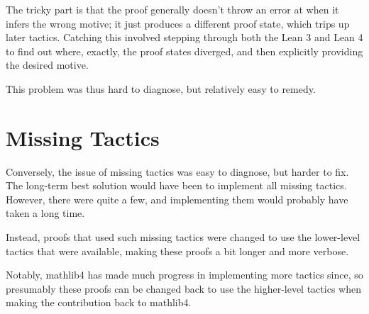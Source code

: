 The tricky part is that the proof generally doesn't throw an error at  when it
infers the wrong motive; it just produces a different proof state, which trips up later tactics.
Catching this involved stepping through both the Lean 3 and Lean 4 to find out where, exactly, the proof states
diverged, and then explicitly providing the desired motive.

This problem was thus hard to diagnose, but relatively easy to remedy.


\section{Missing Tactics} 
Conversely, the issue of missing tactics was easy to diagnose, but harder to fix.
The long-term best solution would have been to implement all missing tactics.
However, there were quite a few, and implementing them would probably have taken a long time.

Instead, proofs that used such missing tactics were changed to use the lower-level tactics that were
available, making these proofs a bit longer and more verbose.

Notably, mathlib4 has made much progress in implementing more tactics since, 
so presumably these proofs can be changed back to use the higher-level tactics when
making the contribution back to mathlib4.



